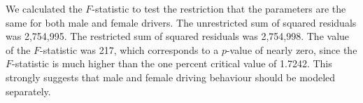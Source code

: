 



We calculated the $F$-statistic to test the restriction 
that the parameters are the same for both male and female drivers. 
The unrestricted sum of squared residuals was 2,754,995. 
The restricted sum of squared residuals was 2,754,998. 
The value of the $F$-statistic was 217, 
which corresponds to a $p$-value of nearly zero, since the $F$-statistic is much higher than 
 the one percent critical value of 1.7242. 
This strongly suggests that male and female driving behaviour should be modeled separately. 
